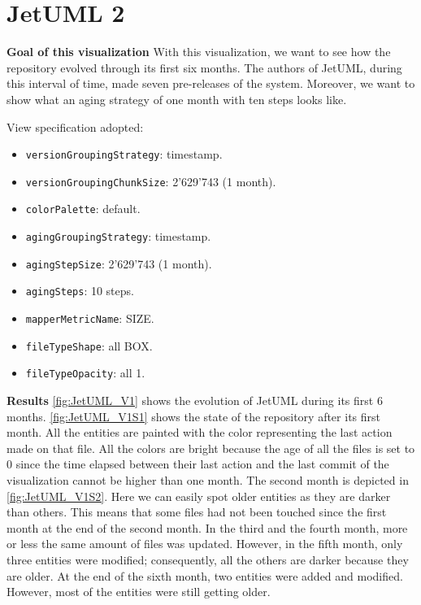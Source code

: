 \clearpage
\section{JetUML 2}
\textbf{Goal of this visualization}
With this visualization, we want to see how the repository evolved through its first six months. 
The authors of JetUML, during this interval of time, made seven pre-releases of the system. 
Moreover, we want to show what an aging strategy of one month with ten steps looks like. 


View specification adopted: 
\begin{itemize}
    \item \texttt{versionGroupingStrategy}: timestamp.
    \item \texttt{versionGroupingChunkSize}: 2'629'743 (1 month). 
    \item \texttt{colorPalette}: default.
    \item \texttt{agingGroupingStrategy}: timestamp.
    \item \texttt{agingStepSize}: 2'629'743 (1 month).
    \item \texttt{agingSteps}: 10 steps.
    \item \texttt{mapperMetricName}: SIZE. 
    \item \texttt{fileTypeShape}: all BOX. 
    \item \texttt{fileTypeOpacity}: all 1. 
\end{itemize}

\textbf{Results}
\autoref{fig:JetUML_V1} shows the evolution of JetUML during its first 6 months. \autoref{fig:JetUML_V1S1} shows the state of the repository after its first month. All the entities are painted with the color representing the last action made on that file. All the colors are bright because the age of all the files is set to 0 since the time elapsed between their last action and the last commit of the visualization cannot be higher than one month. The second month is depicted in \autoref{fig:JetUML_V1S2}. Here we can easily spot older entities as they are darker than others. This means that some files had not been touched since the first month at the end of the second month. In the third and the fourth month, more or less the same amount of files was updated. However, in the fifth month, only three entities were modified; consequently, all the others are darker because they are older. 
At the end of the sixth month, two entities were added and modified. However, most of the entities were still getting older. 

